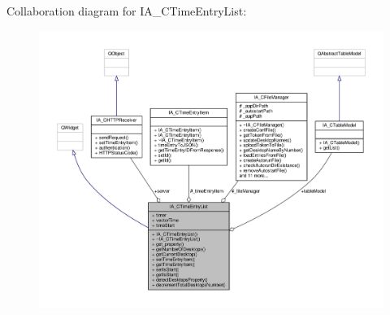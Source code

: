 Collaboration diagram for I\+A\+\_\+\+C\+Time\+Entry\+List\+:
\nopagebreak
\begin{figure}[H]
\begin{center}
\leavevmode
\includegraphics[width=350pt]{classIA__CTimeEntryList__coll__graph}
\end{center}
\end{figure}
